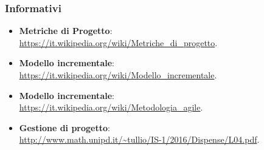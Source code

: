 {		\subsubsection{Informativi}
			\begin{itemize}
				\item \textbf{Metriche di Progetto}: \\
				\textcolor{blue}{\url{https://it.wikipedia.org/wiki/Metriche_di_progetto}}.
				\item \textbf{Modello incrementale}: \\
				\textcolor{blue}{\url{https://it.wikipedia.org/wiki/Modello_incrementale}}.
				\item \textbf{Modello incrementale}: \\
				\textcolor{blue}{\url{https://it.wikipedia.org/wiki/Metodologia_agile}}.
				\item \textbf{Gestione di progetto}: \\
				\textcolor{blue}{\url{http://www.math.unipd.it/~tullio/IS-1/2016/Dispense/L04.pdf}}.
			\end{itemize}
}
